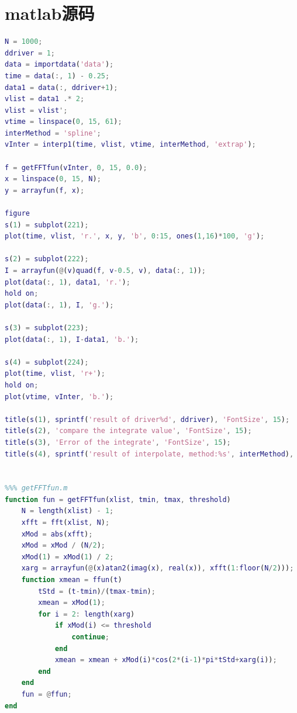 \documentclass[bwprint]{cumcmthesis}
\begin{document}
        \section{matlab源码}
        \begin{lstlisting}[language=matlab]
%%% main.m
N = 1000;
ddriver = 1;
data = importdata('data');
time = data(:, 1) - 0.25;
data1 = data(:, ddriver+1);
vlist = data1 .* 2;
vlist = vlist';
vtime = linspace(0, 15, 61);
interMethod = 'spline';
vInter = interp1(time, vlist, vtime, interMethod, 'extrap');

f = getFFTfun(vInter, 0, 15, 0.0);
x = linspace(0, 15, N);
y = arrayfun(f, x);

figure
s(1) = subplot(221);
plot(time, vlist, 'r.', x, y, 'b', 0:15, ones(1,16)*100, 'g');

s(2) = subplot(222);
I = arrayfun(@(v)quad(f, v-0.5, v), data(:, 1));
plot(data(:, 1), data1, 'r.');
hold on;
plot(data(:, 1), I, 'g.');

s(3) = subplot(223);
plot(data(:, 1), I-data1, 'b.');

s(4) = subplot(224);
plot(time, vlist, 'r+');
hold on;
plot(vtime, vInter, 'b.');

title(s(1), sprintf('result of driver%d', ddriver), 'FontSize', 15);
title(s(2), 'compare the integrate value', 'FontSize', 15);
title(s(3), 'Error of the integrate', 'FontSize', 15);
title(s(4), sprintf('result of interpolate, method:%s', interMethod), 'FontSize', 15);


%%% getFFTfun.m
function fun = getFFTfun(xlist, tmin, tmax, threshold)
    N = length(xlist) - 1;
    xfft = fft(xlist, N);
    xMod = abs(xfft);
    xMod = xMod / (N/2);
    xMod(1) = xMod(1) / 2;
    xarg = arrayfun(@(x)atan2(imag(x), real(x)), xfft(1:floor(N/2)));
    function xmean = ffun(t)
        tStd = (t-tmin)/(tmax-tmin);
        xmean = xMod(1);
        for i = 2: length(xarg)
            if xMod(i) <= threshold
                continue;
            end
            xmean = xmean + xMod(i)*cos(2*(i-1)*pi*tStd+xarg(i));
        end
    end
    fun = @ffun;
end

        \end{lstlisting}
\end{document}
